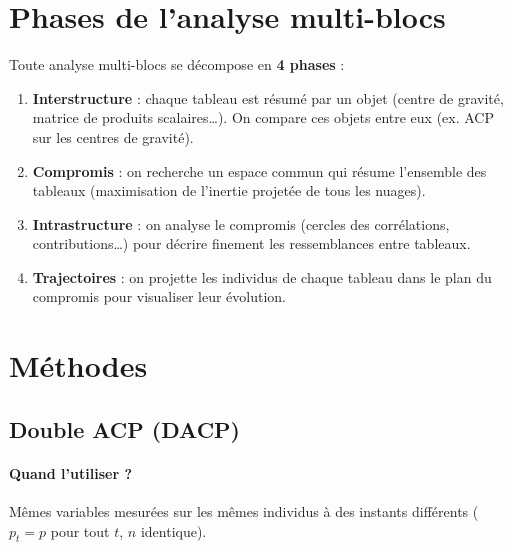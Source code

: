 \documentclass[a4paper,11pt]{article}
\begin{document}
\section{Phases de l'analyse multi-blocs}

Toute analyse multi-blocs se décompose en \textbf{4 phases} :

\begin{enumerate}
    \item \textbf{Interstructure} : chaque tableau est résumé par un objet (centre de gravité, matrice de produits scalaires\ldots). On compare ces objets entre eux (ex. ACP sur les centres de gravité).
    \item \textbf{Compromis} : on recherche un espace commun qui résume l'ensemble des tableaux (maximisation de l'inertie projetée de tous les nuages).
    \item \textbf{Intrastructure} : on analyse le compromis (cercles des corrélations, contributions\ldots) pour décrire finement les ressemblances entre tableaux.
    \item \textbf{Trajectoires} : on projette les individus de chaque tableau dans le plan du compromis pour visualiser leur évolution.
\end{enumerate}

\section{Méthodes}

\subsection{Double ACP (DACP)}
\label{sec:dacp}

\paragraph{Quand l'utiliser ?}
Mêmes variables mesurées sur les mêmes individus à des instants différents ($p_t = p$ pour tout $t$, $n$ identique).
\end{document}
